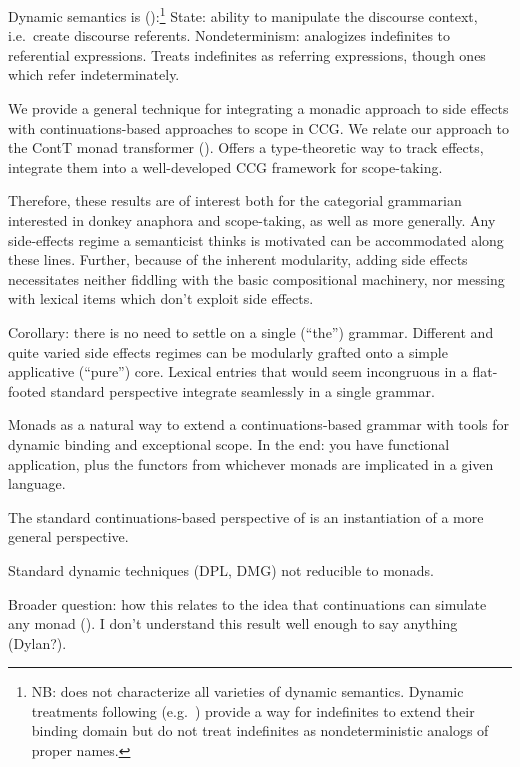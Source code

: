 	Dynamic semantics is (\citealt{Shan:2001}):\footnote{NB: does not characterize all varieties of dynamic semantics. Dynamic treatments following \citealt{GroenendijkStokhof:1990} (e.g.~\citealt{Zimmermann:1991, Dekker:1993, Szabolcsi:2003, Groote:2006}) provide a way for indefinites to extend their binding domain but do not treat indefinites as nondeterministic analogs of proper names.}%
		State: ability to manipulate the discourse context, i.e.~create discourse referents.%
		Nondeterminism: analogizes indefinites to referential expressions. Treats indefinites as referring expressions, though ones which refer indeterminately.%
	
	We provide a general technique for integrating a monadic approach to side effects with continuations-based approaches to scope in CCG. We relate our approach to the ContT monad transformer (\citealt{Liangetal}). Offers a type-theoretic way to track effects, integrate them into a well-developed CCG framework for scope-taking.%
	
	Therefore, these results are of interest both for the categorial grammarian interested in donkey anaphora and scope-taking, as well as more generally. Any side-effects regime a semanticist thinks is motivated can be accommodated along these lines. Further, because of the inherent modularity, adding side effects necessitates neither fiddling with the basic compositional machinery, nor messing with lexical items which don't exploit side effects.%
	
	Corollary: there is no need to settle on a single (``the'') grammar. Different and quite varied side effects regimes can be modularly grafted onto a simple applicative (``pure'') core. Lexical entries that would seem incongruous in a flat-footed standard perspective integrate seamlessly in a single grammar. %
	
	Monads as a natural way to extend a continuations-based grammar with tools for dynamic binding and exceptional scope. In the end: you have functional application, plus the functors from whichever monads are implicated in a given language. %
	
	The standard continuations-based perspective of \citealt{Barker:2002, ShanBarker:2006, BarkerShan:2014} is an instantiation of a more general perspective.%
	
	Standard dynamic techniques (DPL, DMG) not reducible to monads. 
	
	Broader question: how this relates to the idea that continuations can simulate any monad (\citealt{Filinski:1994}). I don't understand this result well enough to say anything (Dylan?). %

